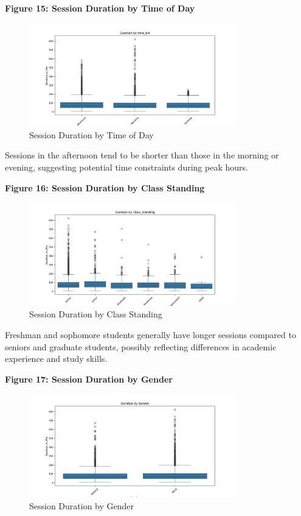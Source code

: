 \documentclass[12pt,letterpaper]{article}
\begin{document}
\textbf{Figure 15: Session Duration by Time of Day}

\begin{figure}[H]
    \centering
    \includegraphics[width=0.8\textwidth]{duration_prediction/visualizations/boxplot_time_bin.png}
    \caption{Session Duration by Time of Day}
\end{figure}

Sessions in the afternoon tend to be shorter than those in the morning or evening, suggesting potential time constraints during peak hours.

\textbf{Figure 16: Session Duration by Class Standing}

\begin{figure}[H]
    \centering
    \includegraphics[width=0.8\textwidth]{duration_prediction/visualizations/boxplot_Class_Standing.png}
    \caption{Session Duration by Class Standing}
\end{figure}

Freshman and sophomore students generally have longer sessions compared to seniors and graduate students, possibly reflecting differences in academic experience and study skills.

\textbf{Figure 17: Session Duration by Gender}

\begin{figure}[H]
    \centering
    \includegraphics[width=0.8\textwidth]{duration_prediction/visualizations/boxplot_Gender.png}
    \caption{Session Duration by Gender}
\end{figure}
\end{document}
